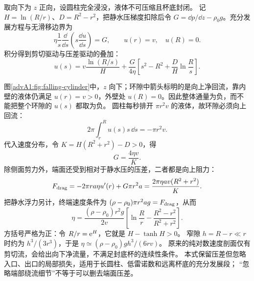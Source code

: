 {\begin{advsolution}
取向下为 $z$ 正向，设圆柱完全浸没，液体不可压缩且杯底封闭。
记 $H=\ln(R/r)$、$D=R^2-r^2$，把静水压梯度扣除后令
$G=\dd p/\dd z-\rho_0g$。充分发展方程与无滑移边界为
\[
 \eta\frac1s\frac{\dd}{\dd s}\left(s\frac{\dd u}{\dd s}\right)=G,
 \qquad u(r)=v,\quad u(R)=0.
\]
积分得到剪切驱动与压差驱动的叠加：
\[
 u(s)=v\frac{\ln(R/s)}H+
 \frac G{4\eta}\left[s^2-R^2+\frac D H\ln\frac R s\right].
\]
\begin{center}\begin{minipage}{\linewidth}\centering
{}
\label{advA1:fig:falling-cylinder}
\end{minipage}\end{center}
\par\Needspace{.60\textheight}
图\ref{advA1:fig:falling-cylinder}中，$z$ 向下；环隙中箭头标明的是向上净回流，靠内壁的液体仍满足 $u(r)=v>0$，外壁处 $u(R)=0$。因此整体通量为负，而不能把整个环隙的 $u(s)$ 都取为负。
圆柱每秒排开 $\pi r^2v$ 的液体，故环隙必须向上回流：
\[
 2\pi\int_r^R u(s)s\,\dd s=-\pi r^2v.
\]
代入速度分布，令 $K=H(R^2+r^2)-D>0$，得
\[
 G=\frac{4\eta v}K.
\]
除侧面剪力外，端面还受到相对于静水压的压差，二者都是向上阻力：
\[
 F_{\rm drag}=-2\pi ra\eta u'(r)+G\pi r^2a
 =\frac{2\pi\eta av(R^2+r^2)}K.
\]
把静水浮力另计，终端速度条件为
$(\rho-\rho_0)\pi r^2ag=F_{\rm drag}$，从而
\[
 \boxed{\eta=\frac{(\rho-\rho_0)r^2g}{2v}
 \left[\ln\frac Rr-\frac{R^2-r^2}{R^2+r^2}\right]}.
\]
方括号严格为正：令 $R/r=\mathrm e^H$，它就是 $H-\tanh H>0$。
窄隙 $h=R-r\ll r$ 时约为 $h^3/(3r^3)$，于是
$\eta\simeq(\rho-\rho_0)gh^3/(6rv)$。
原来的纯对数速度剖面仅有剪切流，会给出向下净流量，不满足封底杯的连续性条件。
本式保留压差但忽略入口、出口的局部损失，适用于长圆柱、低雷诺数和远离杯底的充分发展段；
“忽略端部绕流细节”不等于可以删去端面压差。

\end{advsolution}

}


